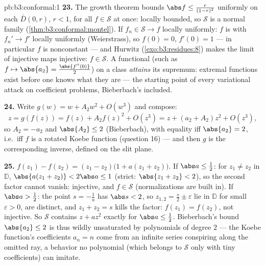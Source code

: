 \begin{solution}{pb:b3:conformal:1}
\textbf{23.} The growth theorem bounds $\abs f \leq
\frac{r}{(1-r)^2}$ uniformly on each $\bar D(0, r)$, $r <
1$, for all $f \in \mathcal S$ at once: locally bounded, so
$\mathcal S$ is a normal family
(\cref{thm:b3:conformal:montel}). If $f_n \in \mathcal S \to
f$ locally uniformly: $f$ is  with $f_n' \to f'$
locally uniformly (Weierstrass), so $f(0) = 0$, $f'(0) = 1$
--- in particular $f$ is nonconstant --- and Hurwitz
(\cref{exo:b3:residues:8}) makes the limit of injective maps
injective: $f \in \mathcal S$. A  functional (such
as $f \mapsto \abs{a_2} = \frac{\abs{f''(0)}}2$) on a
 class \emph{attains} its supremum: extremal
functions exist before one knows what they are --- the
starting point of every variational attack on coefficient
problems, Bieberbach's included.

\textbf{24.} Write $g(w) = w + A_2w^2 + O(w^3)$ and compose:
\[
z = g(f(z)) = f(z) + A_2f(z)^2 + O(z^3)
= z + (a_2 + A_2)z^2 + O(z^3),
\]
so $A_2 = -a_2$ and $\abs{A_2} \leq 2$ (Bieberbach), with
equality iff $\abs{a_2} = 2$, i.e.\ iff $f$ is a rotated
Koebe function (question 16) --- and then $g$ is the
corresponding inverse, defined on the slit plane.

\textbf{25.} $f(z_1) - f(z_2) = (z_1 - z_2)\bigl(1 + a(z_1 +
z_2)\bigr)$. If $\abs a \leq \frac12$: for $z_1 \neq z_2$ in
$\mathbb D$, $\abs{a(z_1 + z_2)} < 2\abs a \leq 1$ (strict:
$\abs{z_1 + z_2} < 2$), so the second factor cannot vanish:
injective, and $f \in \mathcal S$ (normalizations are
built in). If $\abs a > \frac12$: the point $s =
-\frac1a$ has $\abs s < 2$, so $z_{1,2} = \frac s2 \pm
\varepsilon$ lie in $\mathbb D$ for small $\varepsilon > 0$,
are distinct, and $z_1 + z_2 = s$ kills the factor: $f(z_1)
= f(z_2)$, not injective. So $\mathcal S$ contains $z +
az^2$ exactly for $\abs a \leq \frac12$. Bieberbach's bound
$\abs{a_2} \leq 2$ is thus wildly unsaturated by
polynomials of degree $2$ --- the Koebe function's
coefficients $a_n = n$ come from an infinite series
conspiring along the omitted ray, a behavior no polynomial
(which belongs to $\mathcal S$ only with tiny coefficients)
can imitate.
\end{solution}

